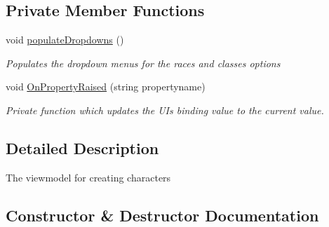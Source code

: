 \subsection*{Private Member Functions}
\begin{DoxyCompactItemize}
\item 
void \mbox{\hyperlink{class_dungeons__n___dragons___manager_1_1_viewmodels_1_1_create_character_window_viewmodel_a2e208684ba75cd43f211c9c5966064d1}{populate\+Dropdowns}} ()
\begin{DoxyCompactList}\small\item\em Populates the dropdown menus for the races and classes options \end{DoxyCompactList}\item 
void \mbox{\hyperlink{class_dungeons__n___dragons___manager_1_1_viewmodels_1_1_create_character_window_viewmodel_a53f8799bcfdd43bf342dcb14d77b2f82}{On\+Property\+Raised}} (string propertyname)
\begin{DoxyCompactList}\small\item\em Private function which updates the UI\textquotesingle{}s binding value to the current value. \end{DoxyCompactList}\end{DoxyCompactItemize}


\subsection{Detailed Description}
The viewmodel for creating characters 



\subsection{Constructor \& Destructor Documentation}
\mbox{\label{class_dungeons__n___dragons___manager_1_1_viewmodels_1_1_create_character_window_viewmodel_ae964b05d5a56ee6d4782e6a70ae3b139}} 
